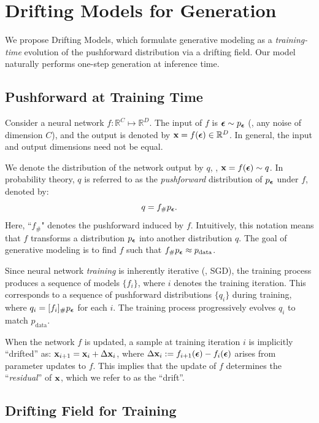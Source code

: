 \section{Drifting Models for Generation}
\label{sec:methodology}

We propose Drifting Models, which formulate generative modeling as a \emph{training-time} evolution of the pushforward distribution via a drifting field.
Our model naturally performs one-step generation at inference time.

\subsection{Pushforward at Training Time}
\label{subsec:training_time_pushforward}

Consider a neural network $f: \mathbb{R}^C \mapsto \mathbb{R}^D$. The input of $f$ is ${\boldsymbol{\epsilon}} \sim p_{{\boldsymbol{\epsilon}}}$ (\eg, any noise of dimension $C$), and the output is denoted by $\mathbf{x} = f({\boldsymbol{\epsilon}}) \in \mathbb{R}^D$. In general, the input and output dimensions need not be equal.

We denote the distribution of the network output by $q$, \ie, $\mathbf{x} = f({\boldsymbol{\epsilon}}) \sim q$.
In probability theory, $q$ is referred to as the \textit{pushforward} distribution of $p_{\boldsymbol{\epsilon}}$ under $f$, denoted by:
\begin{equation}
q = f_{\#}p_{\boldsymbol{\epsilon}}.
\end{equation}
Here, ``$f_{\#}$" denotes the pushforward induced by $f$.
Intuitively, this notation means that $f$ transforms a distribution $p_{{\boldsymbol{\epsilon}}}$ into another distribution $q$.
The goal of generative modeling is to find $f$ such that $f_{\#}p_{{\boldsymbol{\epsilon}}} \approx p_\text{data}$.

Since neural network \textit{training} is inherently iterative (\eg, SGD), the training process produces a sequence of models $\{f_i\}$, where $i$ denotes the training iteration.
This corresponds to a sequence of pushforward distributions $\{q_i\}$ during training, where
$q_i = [f_i]_{\#}p_{{\boldsymbol{\epsilon}}}$ for each $i$.
The training process progressively evolves $q_i$ to match $p_{\text{data}}$.

When the network $f$ is updated,
a sample at training iteration $i$ is implicitly ``drifted'' as:
$\mathbf{x}_{i+1} = \mathbf{x}_{i} + \Delta\mathbf{x}_{i}$, where $ \Delta\mathbf{x}_{i}:=f_{i+1}({\boldsymbol{\epsilon}}) - f_{i}({\boldsymbol{\epsilon}})$ arises from parameter updates to $f$.
This implies that the update of $f$ determines the ``\textit{residual}'' of $\mathbf{x}$, which we refer to as the ``drift''.

\subsection{Drifting Field for Training}
\label{subsec:training_objective}

